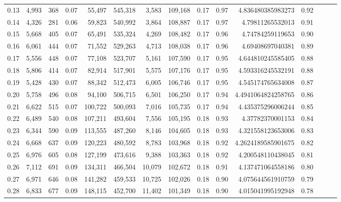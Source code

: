 \begin{tabular}{rrrrrrrrrrrrrrr}
0.13 &   4,993 &    368 &  0.07 &   55,497 &  545,318 &    3,583 &  109,168 &  0.17 &  0.97 &     4.836480385983273 &      0.92 \\
0.14 &   4,326 &    281 &  0.06 &   59,823 &  540,992 &    3,864 &  108,887 &  0.17 &  0.97 &      4.79811265532013 &      0.91 \\
0.15 &   5,668 &    405 &  0.07 &   65,491 &  535,324 &    4,269 &  108,482 &  0.17 &  0.96 &      4.74784259119653 &      0.90 \\
0.16 &   6,061 &    444 &  0.07 &   71,552 &  529,263 &    4,713 &  108,038 &  0.17 &  0.96 &      4.69408697040381 &      0.89 \\
0.17 &   5,556 &    448 &  0.07 &   77,108 &  523,707 &    5,161 &  107,590 &  0.17 &  0.95 &     4.644810245585405 &      0.88 \\
0.18 &   5,806 &    414 &  0.07 &   82,914 &  517,901 &    5,575 &  107,176 &  0.17 &  0.95 &     4.593316245532191 &      0.88 \\
0.19 &   5,428 &    430 &  0.07 &   88,342 &  512,473 &    6,005 &  106,746 &  0.17 &  0.95 &     4.545174765634008 &      0.87 \\
0.20 &   5,758 &    496 &  0.08 &   94,100 &  506,715 &    6,501 &  106,250 &  0.17 &  0.94 &    4.4941064824258765 &      0.86 \\
0.21 &   6,622 &    515 &  0.07 &  100,722 &  500,093 &    7,016 &  105,735 &  0.17 &  0.94 &     4.435375296006244 &      0.85 \\
0.22 &   6,489 &    540 &  0.08 &  107,211 &  493,604 &    7,556 &  105,195 &  0.18 &  0.93 &      4.37782370001153 &      0.84 \\
0.23 &   6,344 &    590 &  0.09 &  113,555 &  487,260 &    8,146 &  104,605 &  0.18 &  0.93 &     4.321558123653006 &      0.83 \\
0.24 &   6,668 &    637 &  0.09 &  120,223 &  480,592 &    8,783 &  103,968 &  0.18 &  0.92 &    4.2624189585901675 &      0.82 \\
0.25 &   6,976 &    605 &  0.08 &  127,199 &  473,616 &    9,388 &  103,363 &  0.18 &  0.92 &     4.200548110438045 &      0.81 \\
0.26 &   7,112 &    691 &  0.09 &  134,311 &  466,504 &   10,079 &  102,672 &  0.18 &  0.91 &     4.137471064558186 &      0.80 \\
0.27 &   6,971 &    646 &  0.08 &  141,282 &  459,533 &   10,725 &  102,026 &  0.18 &  0.90 &     4.075644561910759 &      0.79 \\
0.28 &   6,833 &    677 &  0.09 &  148,115 &  452,700 &   11,402 &  101,349 &  0.18 &  0.90 &     4.015041995192948 &      0.78 \\

\end{tabular}
